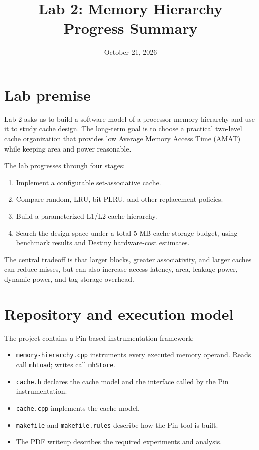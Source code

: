 \documentclass[11pt]{article}
\title{Lab 2: Memory Hierarchy\\Progress Summary}
\author{}
\date{October 21, 2026}
\begin{document}
\maketitle

\section{Lab premise}

Lab 2 asks us to build a software model of a processor memory hierarchy and use it
to study cache design. The long-term goal is to choose a practical two-level
cache organization that provides low Average Memory Access Time (AMAT) while
keeping area and power reasonable.

The lab progresses through four stages:
\begin{enumerate}[leftmargin=*]
  \item Implement a configurable set-associative cache.
  \item Compare random, LRU, bit-PLRU, and other replacement policies.
  \item Build a parameterized L1/L2 cache hierarchy.
  \item Search the design space under a total 5 MB cache-storage budget, using
        benchmark results and Destiny hardware-cost estimates.
\end{enumerate}

The central tradeoff is that larger blocks, greater associativity, and larger
caches can reduce misses, but can also increase access latency, area, leakage
power, dynamic power, and tag-storage overhead.

\section{Repository and execution model}

The project contains a Pin-based instrumentation framework:
\begin{itemize}[leftmargin=*]
  \item \texttt{memory-hierarchy.cpp} instruments every executed memory
        operand. Reads call \texttt{mhLoad}; writes call \texttt{mhStore}.
  \item \texttt{cache.h} declares the cache model and the interface called by
        the Pin instrumentation.
  \item \texttt{cache.cpp} implements the cache model.
  \item \texttt{makefile} and \texttt{makefile.rules} describe how the Pin
        tool is built.
  \item The PDF writeup describes the required experiments and analysis.
\end{itemize}
\end{document}
